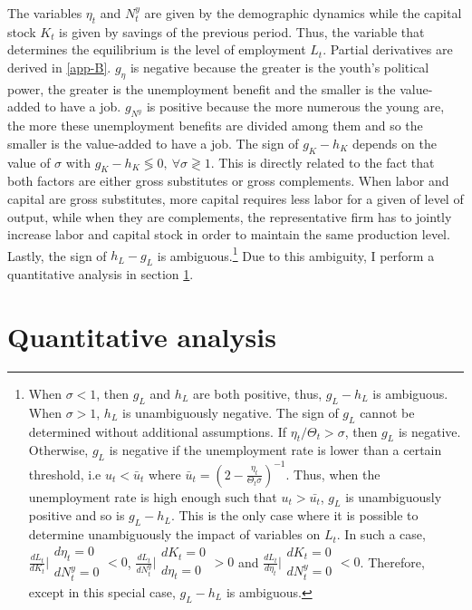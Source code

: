 \documentclass[
]{article}
\begin{document}
The variables \(\eta_t\) and \(N_t^y\) are given by the demographic dynamics while the capital stock \(K_t\) is given by savings of the previous period. Thus, the variable that determines the equilibrium is the level of employment \(L_t\). Partial derivatives are derived in \ref{app-B}.
\(g_\eta\) is negative because the greater is the youth's political power, the greater is the unemployment benefit and the smaller is the value-added to have a job. \(g_{N^y}\) is positive because the more numerous the young are, the more these unemployment benefits are divided among them and so the smaller is the value-added to have a job. The sign of \(g_K-h_K\) depends on the value of \(\sigma\) with \(g_K-h_K \lessgtr 0, ~ \forall \sigma \gtrless 1\). This is directly related to the fact that both factors are either gross substitutes or gross complements. When labor and capital are gross substitutes, more capital requires less labor for a given of level of output, while when they are complements, the representative firm has to jointly increase labor and capital stock in order to maintain the same production level. Lastly, the sign of \(h_L-g_L\) is ambiguous.\footnote{When \(\sigma < 1\), then \(g_L\) and \(h_L\) are both positive, thus, \(g_L-h_L\) is ambiguous. When \(\sigma > 1\), \(h_L\) is unambiguously negative. The sign of \(g_L\) cannot be determined without additional assumptions. If \(\eta_t/\Theta_t > \sigma\), then \(g_L\) is negative. Otherwise, \(g_L\) is negative if the unemployment rate is lower than a certain threshold, i.e \(u_t < \bar{u}_t\) where \(\bar{u}_t = \left(2 - \frac{\eta_t}{\Theta_t\sigma}\right)^{-1}\). Thus, when the unemployment rate is high enough such that \(u_t > \bar{u_t}\), \(g_L\) is unambiguously positive and so is \(g_L-h_L\). This is the only case where it is possible to determine unambiguously the impact of variables on \(L_t\). In such a case, \(\frac{dL_t}{dK_t}\Bigr|{\substack{d\eta_t = 0\\dN_t^y = 0}} < 0\), \(\frac{dL_t}{dN^y_t}\Bigr|{\substack{dK_t = 0\\d\eta_t = 0}} > 0\) and \(\frac{dL_t}{d\eta_t}\Bigr|{\substack{dK_t = 0\\dN_t^y = 0}} < 0\). Therefore, except in this special case, \(g_L-h_L\) is ambiguous.} Due to this ambiguity, I perform a quantitative analysis in section \ref{quantitative}.

\hypertarget{quantitative}{%
\section{Quantitative analysis}\label{quantitative}}
\end{document}
